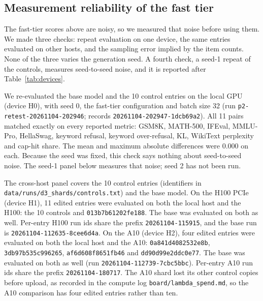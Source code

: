 \subsection{Measurement reliability of the fast tier}
\label{sec:reliability}
\sloppy
The fast-tier scores above are noisy, so we measured that noise before using them. We made three checks: repeat evaluation on one device, the same entries evaluated on other hosts, and the sampling error implied by the item counts. None of the three varies the generation seed. A fourth check, a seed-1 repeat of the controls, measures seed-to-seed noise, and it is reported after Table~\ref{tab:devices}.

We re-evaluated the base model and the 10 control entries on the local GPU (device H0), with seed 0, the fast-tier configuration and batch size 32 (run \texttt{p2-retest-20261104-202946}; records \texttt{20261104-202947-1dcb69a2}). All 11 pairs matched exactly on every reported metric: GSM8K, MATH-500, IFEval, MMLU-Pro, HellaSwag, keyword refusal, keyword over-refusal, KL, WikiText perplexity and cap-hit share. The mean and maximum absolute differences were 0.000 on each. Because the seed was fixed, this check says nothing about seed-to-seed noise. The seed-1 panel below measures that noise; seed 2 has not been run.

The cross-host panel covers the 10 control entries (identifiers in \texttt{data/runs/d3\_shards/controls.txt}) and the base model. On the H100 PCIe (device H1), 11 edited entries were evaluated on both the local host and the H100: the 10 controls and \texttt{013b7b61202fe188}. The base was evaluated on both as well. Per-entry H100 run ids share the prefix \texttt{20261104-115915}, and the base run is \texttt{20261104-112635-8cee6d4a}. On the A10 (device H2), four edited entries were evaluated on both the local host and the A10: \texttt{0a841d4082532e8b}, \texttt{3db97b535c996265}, \texttt{af6d608f8651fb46} and \texttt{dd90d99e2ddc0e77}. The base was evaluated on both as well (run \texttt{20261104-112739-7cbc5bbc}). Per-entry A10 run ids share the prefix \texttt{20261104-180717}. The A10 shard lost its other control copies before upload, as recorded in the compute log \texttt{board/lambda\_spend.md}, so the A10 comparison has four edited entries rather than ten.

